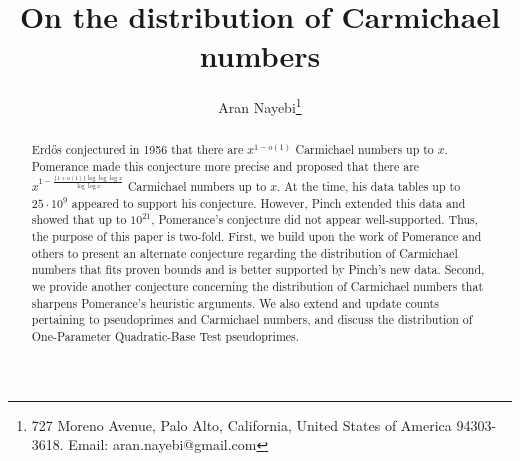\documentclass[11pt]{article}
\title{On the distribution of Carmichael numbers}
\author{Aran Nayebi\thanks{727 Moreno Avenue, Palo Alto, California, United States of America 94303-3618. Email: aran.nayebi@gmail.com}}
\date{}
\theoremstyle{plain}
\theoremstyle{definition}
\theoremstyle{remark}
\numberwithin{equation}{subsection}
\DeclareMathOperator{\ord}{ord}
\begin{document}
\maketitle
\thispagestyle{empty}


\begin{abstract}
Erd\H{o}s conjectured in 1956 that there are $x^{1-o(1)}$ Carmichael numbers up to $x$. Pomerance made this conjecture more precise and proposed that there are $x^{1-{\frac{\{1+o(1)\}\log\log\log x}{\log\log x}}}$ Carmichael numbers up to $x$. At the time, his data tables up to $25 \cdot 10^{9}$ appeared to support his conjecture. However, Pinch extended this data and showed that up to $10^{21}$, Pomerance's conjecture did not appear well-supported. Thus, the purpose of this paper is two-fold. First, we build upon the work of Pomerance and others to present an alternate conjecture regarding the distribution of Carmichael numbers that fits proven bounds and is better supported by Pinch's new data. Second, we provide another conjecture concerning the distribution of Carmichael numbers that sharpens Pomerance's heuristic arguments. We also extend and update counts pertaining to pseudoprimes and Carmichael numbers, and discuss the distribution of One-Parameter Quadratic-Base Test pseudoprimes.
\end{abstract}

\def\ord{{\mathrm{ord}}}
\def\scr{\scriptstyle}
\def\\{\cr}
\def\[{\left[}
\def\]{\right]}
\def\<{\langle}
\def\>{\rangle}
\def\fl#1{\left\lfloor#1\right\rfloor}
\def\rf#1{\left\lceil#1\right\rceil}
\def\lcm{{\rm lcm\/}}

\def\C{\mathbb C}
\def\R{\mathbb R}
\def\Q{{\mathbb Q}}
\def\F{{\mathbb F}}
\def\Z{{\mathbb Z}}
\def\cO{{\mathcal O}}

\def\ord{{\mathrm{ord}}}
\def\Nm{{\mathrm{Nm}}}
\def\L{{\mathbb L}}

\def\xxx{\vskip5pt\hrule\vskip5pt}
\def\yyy{\vskip5pt\hrule\vskip2pt\hrule\vskip5pt}
\end{document}
